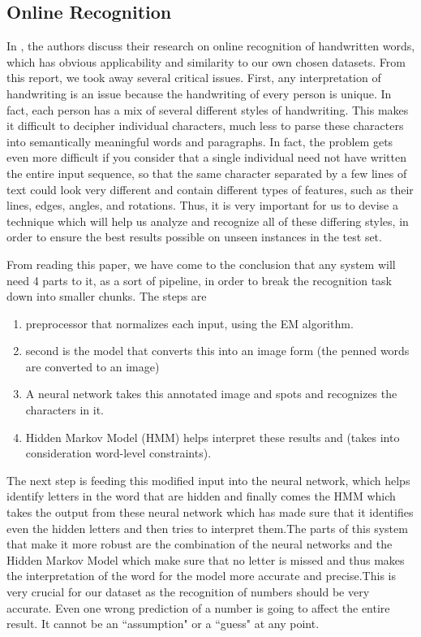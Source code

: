 \documentclass[12pt]{article}  %
\begin{document}
\subsection{Online Recognition}
\label{Online Recognition}
In \cite{online}, the authors discuss their research on online recognition of handwritten words, which has obvious applicability and similarity to our own chosen datasets.  From this report, we took away several critical issues.  First, any interpretation of handwriting is an issue because the handwriting of every person is unique. In fact, each person has a mix of several different styles of handwriting. This makes it difficult to decipher individual characters, much less to parse these characters into semantically meaningful words and paragraphs.  In fact, the problem gets even more difficult if you consider that a single individual need not have written the entire input sequence, so that the same character separated by a few lines of text could look very different and contain different types of features, such as their lines, edges, angles, and rotations. Thus, it is very important for us to devise a technique which will help us analyze and recognize all of these differing styles, in order to ensure the best results possible on unseen instances in the test set.

From reading this paper, we have come to the conclusion that any system will
need 4 parts to it, as a sort of pipeline, in order to break the 
recognition task down into smaller chunks.  The steps are 


\begin{enumerate}
\item preprocessor that normalizes each input, using the EM algorithm.
\item second is the model that converts this into an image form (the penned words are converted to an image)
\item  A neural network takes this annotated image and spots and recognizes the characters in it.
\item Hidden Markov Model (HMM) helps interpret these results and (takes into consideration word-level constraints).
\end{enumerate}

The next step is feeding this modified input into the neural network, which helps identify letters in the word that are hidden and finally comes the HMM which takes the output from these neural network which has made sure that it identifies even the hidden letters and then tries to interpret them.The parts of this system that make it more robust are the combination of the neural networks and the Hidden Markov Model which make sure that no letter is missed and thus makes the interpretation of the word for the model more accurate and precise.This is very crucial for our dataset as the recognition of numbers should be very accurate. Even one wrong prediction of a number is going to affect the entire result. It cannot be an ``assumption" or a ``guess" at any point.
 
\end{document}
